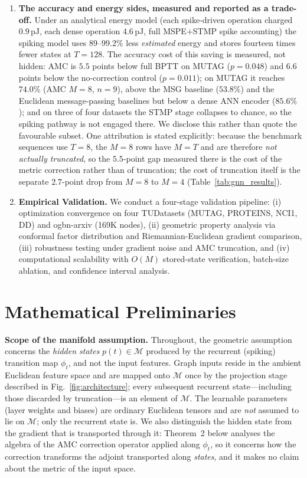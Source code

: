 \documentclass[a4paper,fleqn]{cas-dc}
\begin{document}
\begin{enumerate}
    \item \textbf{The accuracy and energy sides, measured and reported as a trade-off.} Under an analytical energy model (each spike-driven operation charged $0.9$\,pJ, each dense operation $4.6$\,pJ, full MSPE$+$STMP spike accounting) the spiking model uses $89$--$99.2\%$ less \emph{estimated} energy and stores fourteen times fewer states at $T{=}128$. The accuracy cost of this saving is measured, not hidden: AMC is $5.5$ points below full BPTT on MUTAG ($p{=}0.048$) and $6.6$ points below the no-correction control ($p{=}0.011$); on MUTAG it reaches $74.0\%$ (AMC $M{=}8$, $n{=}9$), above the MSG baseline ($53.8\%$) and the Euclidean message-passing baselines but below a dense ANN encoder ($85.6\%$); and on three of four datasets the STMP stage collapses to chance, so the spiking pathway is not engaged there. We disclose this rather than quote the favourable subset. One attribution is stated explicitly: because the benchmark sequences use $T{=}8$, the $M{=}8$ rows have $M{=}T$ and are therefore \emph{not actually truncated}, so the $5.5$-point gap measured there is the cost of the metric correction rather than of truncation; the cost of truncation itself is the separate $2.7$-point drop from $M{=}8$ to $M{=}4$ (Table~\ref{tab:gnn_results}).
    
    \item \textbf{Empirical Validation.} We conduct a four-stage validation pipeline: (i) optimization convergence on four TUDatasets (MUTAG, PROTEINS, NCI1, DD) and ogbn-arxiv (169K nodes), (ii) geometric property analysis via conformal factor distribution and Riemannian-Euclidean gradient comparison, (iii) robustness testing under gradient noise and AMC truncation, and (iv) computational scalability with $O(M)$ stored-state verification, batch-size ablation, and confidence interval analysis.
\end{enumerate}

\section{Mathematical Preliminaries}
\label{sec:prelim}

\textbf{Scope of the manifold assumption.} Throughout, the geometric assumption concerns the \emph{hidden states} $p(t)\in\mathcal{M}$ produced by the recurrent (spiking) transition map $\phi_t$, and not the input features. Graph inputs reside in the ambient Euclidean feature space and are mapped onto $\mathcal{M}$ once by the projection stage described in Fig.~\ref{fig:architecture}; every subsequent recurrent state---including those discarded by truncation---is an element of $\mathcal{M}$. The learnable parameters (layer weights and biases) are ordinary Euclidean tensors and are \emph{not} assumed to lie on $\mathcal{M}$; only the recurrent state is. We also distinguish the hidden state from the gradient that is transported through it: Theorem~2 below analyses the algebra of the AMC correction operator applied along $\phi_t$, so it concerns how the correction transforms the adjoint transported along \emph{states}, and it makes no claim about the metric of the input space.
\end{document}

